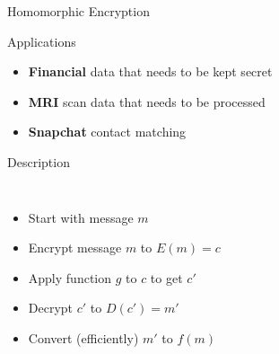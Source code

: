 \documentclass[12pt]{beamer}
\begin{document}
\begin{frame}{Homomorphic Encryption}
	\begin{block}{Applications}
		\begin{itemize}
			\item \textbf{Financial} data that needs to be kept secret
			\pause
			\item \textbf{MRI} scan data that needs to be processed
			\pause
			\item \textbf{Snapchat} contact matching
		\end{itemize}
	\end{block}
\end{frame}

\begin{frame}{Description}
	\begin{columns}[c]
		 \begin{itemize}
		 	\item<1-> Start with message $m$
		 	\item<2-> Encrypt message $m$ to $E(m) = c$
		 	\item<3-> Apply function $g$ to $c$ to get $c'$
		 	\item<4-> Decrypt $c'$ to $D(c') = m'$
		 	\item<5-> Convert (efficiently) $m'$ to $f(m)$
		 \end{itemize}
	\end{columns}
\end{frame}
\end{document}
